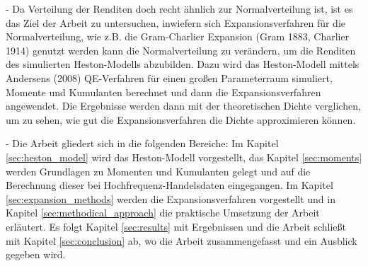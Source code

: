 - Da Verteilung der Renditen doch recht ähnlich zur Normalverteilung ist, ist es das Ziel der Arbeit zu untersuchen, inwiefern sich Expansionsverfahren für die Normalverteilung, wie z.B. die Gram-Charlier Expansion (Gram 1883, Charlier 1914) genutzt werden kann die Normalverteilung zu verändern, um die Renditen des simulierten Heston-Modells abzubilden. Dazu wird das Heston-Modell mittels Andersens (2008) QE-Verfahren für einen großen Parameterraum simuliert, Momente und Kumulanten berechnet und dann die Expansionsverfahren angewendet. Die Ergebnisse werden dann mit der theoretischen Dichte verglichen, um zu sehen, wie gut die Expansionsverfahren die Dichte approximieren können.

- Die Arbeit gliedert sich in die folgenden Bereiche: Im Kapitel \ref{sec:heston_model} wird das Heston-Modell vorgestellt, das Kapitel \ref{sec:moments} werden Grundlagen zu Momenten und Kumulanten gelegt und auf die Berechnung dieser bei Hochfrequenz-Handelsdaten eingegangen. Im Kapitel \ref{sec:expansion_methods} werden die Expansionsverfahren vorgestellt und in Kapitel \ref{sec:methodical_approach} die praktische Umsetzung der Arbeit erläutert. Es folgt Kapitel \ref{sec:results} mit Ergebnissen und die Arbeit schließt mit Kapitel \ref{sec:conclusion} ab, wo die Arbeit zusammengefasst und ein Ausblick gegeben wird.